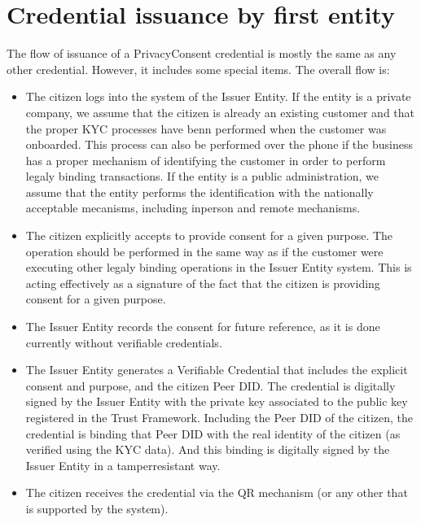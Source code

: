 \documentclass[letterpaper,10pt,english]{sphinxmanual}
\begin{document}
\section{Credential issuance by first entity}
\label{\detokenize{privacycred:credential-issuance-by-first-entity}}
\sphinxAtStartPar
The flow of issuance of a PrivacyConsent credential is mostly the same as any other credential. However, it includes some special items. The overall flow is:
\begin{itemize}
\item {} 
\sphinxAtStartPar
The citizen logs into the system of the Issuer Entity. If the entity is a private company, we assume that the citizen is already an existing customer and that the proper KYC processes have benn performed when the customer was onboarded. This process can also be performed over the phone if the business has a proper mechanism of identifying the customer in order to perform legaly binding transactions. If the entity is a public administration, we assume that the entity performs the identification with the nationally acceptable mecanisms, including in\sphinxhyphen{}person and remote mechanisms.

\item {} 
\sphinxAtStartPar
The citizen explicitly accepts to provide consent for a given purpose. The operation should be performed in the same way as if the customer were executing other legaly binding operations in the Issuer Entity system. This is acting effectively as a signature of the fact that the citizen is providing consent for a given purpose.

\item {} 
\sphinxAtStartPar
The Issuer Entity records the consent for future reference, as it is done currently without verifiable credentials.

\item {} 
\sphinxAtStartPar
The Issuer Entity generates a Verifiable Credential that includes the explicit consent and purpose, and the citizen Peer DID. The credential is digitally signed by the Issuer Entity with the private key associated to the public key registered in the Trust Framework. Including the Peer DID of the citizen, the credential is binding that Peer DID with the real identity of the citizen (as verified using the KYC data). And this binding is digitally signed by the Issuer Entity in a tamper\sphinxhyphen{}resistant way.

\item {} 
\sphinxAtStartPar
The citizen receives the credential via the QR mechanism (or any other that is supported by the system).

\end{itemize}
\end{document}
